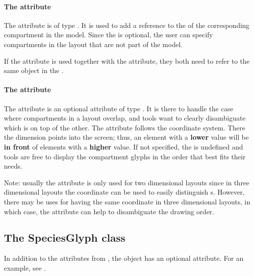 \paragraph{The  attribute}
The  attribute is of type . It 
is used to add a reference to the  of the corresponding 
compartment in the model. Since the  is optional, the 
user can specify compartments in the layout that are not part of the 
model. 

If the  attribute is used together with the
 attribute, they both need to refer to the same object in
the \Model.

\paragraph{The  attribute}
The  attribute is an optional attribute of type 
. It is there to handle the case where compartments in 
a layout overlap, and tools want to clearly disambiguate 
which \CompartmentGlyph is on top of the other. 
The  attribute follows the coordinate system. There 
the  dimension points into the screen; thus, an element 
with a \textbf{lower}  value will be \textbf{in front} of 
elements with a \textbf{higher} value.
If not specified, the  is undefined and tools are free to 
display the compartment glyphs in the order that best fits their needs. 

Note: usually the  attribute is only used for two dimensional
layouts since in three dimensional layouts the  coordinate can be
used to easily distinguish \CompartmentGlyph{}s. However, there may be uses 
for having the same  coordinate in three dimensional layouts, in 
which case, the  attribute can help to disambiguate the drawing
order. 

\subsection{The SpeciesGlyph class}
\label{speciesglyph-class}
In addition to the attributes from \GraphicalObject, the \SpeciesGlyph 
object has an optional  attribute. For an example, see 
.

